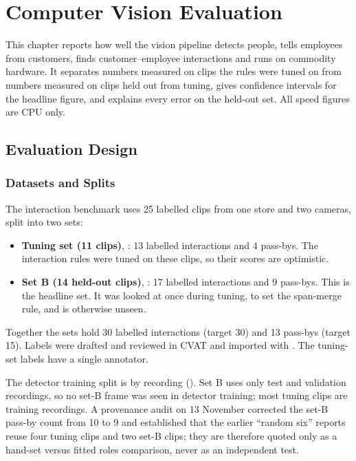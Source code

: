 \chapter{Computer Vision Evaluation}
\label{ch:cveval}

This chapter reports how well the vision pipeline detects people, tells employees from customers, finds customer--employee interactions and runs on commodity hardware. It separates numbers measured on clips the rules were tuned on from numbers measured on clips held out from tuning, gives confidence intervals for the headline figure, and explains every error on the held-out set. All speed figures are CPU only.

\section{Evaluation Design}
\label{sec:cveval-design}

\subsection{Datasets and Splits}
The interaction benchmark uses 25 labelled clips from one store and two cameras, split into two sets:
\begin{itemize}
\item \textbf{Tuning set (11 clips)}, : 13 labelled interactions and 4 pass-bys. The interaction rules were tuned on these clips, so their scores are optimistic.
\item \textbf{Set B (14 held-out clips)}, : 17 labelled interactions and 9 pass-bys. This is the headline set. It was looked at once during tuning, to set the span-merge rule, and is otherwise unseen.
\end{itemize}
Together the sets hold 30 labelled interactions (target 30) and 13 pass-bys (target 15). Labels were drafted and reviewed in CVAT and imported with . The tuning-set labels have a single annotator.

The detector training split is by recording (). Set B uses only test and validation recordings, so no set-B frame was seen in detector training; most tuning clips are training recordings. A provenance audit on 13 November corrected the set-B pass-by count from 10 to 9 and established that the earlier ``random six'' reports reuse four tuning clips and two set-B clips; they are therefore quoted only as a hand-set versus fitted roles comparison, never as an independent test.

